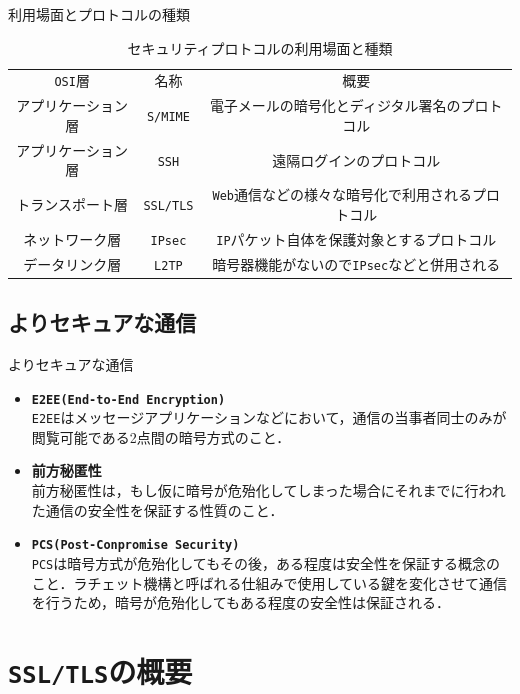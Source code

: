 \documentclass[11pt, aspectratio=169]{beamer}
\begin{document}
\begin{frame}{利用場面とプロトコルの種類}
  \begin{table}[htbp]
    \centering
    \caption{セキュリティプロトコルの利用場面と種類}
    \begin{tabular}{|c|c|c|} \hline
      \texttt{OSI}層 & 名称 & 概要 \\ \hhline{|=|=|=|}
      アプリケーション層 & \texttt{S/MIME} & 電子メールの暗号化とディジタル署名のプロトコル \\ \hline
      アプリケーション層 & \texttt{SSH} & 遠隔ログインのプロトコル \\ \hline
      トランスポート層 & \texttt{SSL/TLS} & \texttt{Web}通信などの様々な暗号化で利用されるプロトコル \\ \hline
      ネットワーク層 & \texttt{IPsec} & \texttt{IP}パケット自体を保護対象とするプロトコル \\ \hline
      データリンク層 & \texttt{L2TP} & 暗号器機能がないので\texttt{IPsec}などと併用される \\ \hline
    \end{tabular}
  \end{table}
\end{frame}

\subsection{よりセキュアな通信}
\begin{frame}{よりセキュアな通信}
  \begin{itemize}
    \item \texttt{\textbf{E2EE(End-to-End Encryption)}} \\
      \texttt{E2EE}はメッセージアプリケーションなどにおいて，通信の当事者同士のみが閲覧可能である2点間の暗号方式のこと．
    \item \textbf{前方秘匿性} \\
      前方秘匿性は，もし仮に暗号が危殆化してしまった場合にそれまでに行われた通信の安全性を保証する性質のこと．
    \item \texttt{\textbf{PCS(Post-Conpromise Security)}} \\
      \texttt{PCS}は暗号方式が危殆化してもその後，ある程度は安全性を保証する概念のこと．ラチェット機構と呼ばれる仕組みで使用している鍵を変化させて通信を行うため，暗号が危殆化してもある程度の安全性は保証される．
  \end{itemize}
\end{frame}

\section{\texttt{SSL/TLS}の概要}
\end{document}
